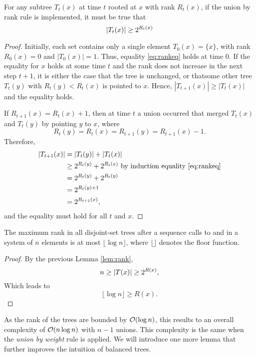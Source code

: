 \begin{lemma}\label{lem:rank}
  For any subtree $T_t(x)$ at time $t$ rooted at $x$ with rank $R_t(x)$, if the union by rank rule is implemented, it must be true that 
  \begin{equation}\label{eq:rankeq}
    \abs{T_t(x)} \geq 2^{R_t(x)}
  \end{equation}
\end{lemma}
\begin{proof}
  Initially, each set contains only a single element $T_0(x) = \{x\}$, with rank $R_0(x)=0$ and $|T_0(x)|=1$. Thus, equality \eqref{eq:rankeq} holds at time $0$. If the equality for $x$ holds at some time $t$ and the rank does not increase in the next step $t+1$, it is either the case that the tree is unchanged, or thatsome other tree $T_t(y)$ with $R_t(y)<R_t(x)$ is pointed to $x$. Hence, $|T_{t+1}(x)| \geq  |T_t(x)|$ and the equality holds. 
  
  If $R_{t+1}(x) = R_t(x) + 1$, then at time $t$ a union occurred that merged $T_t(x)$ and $T_t(y)$ by pointing $y$ to $x$, where
  \begin{equation*}
    R_t(y) = R_t(x) = R_{t+1}(y) = R_{t+1}(x) - 1.
  \end{equation*}
  Therefore,
  \begin{align*}
    \abs{T_{t+1}(x)} &= \abs{T_t(y)} + \abs{T_t(x)} \\
      &\geq 2^{R_t(y)} + 2^{R_t(x)} \text{ by induction equality \eqref{eq:rankeq}} \\
      &= 2^{R_t(y)} + 2^{R_t(y)} \\
      &= 2^{R_t(y)+1} \\
      &= 2^{R_{t+1}(x)},
  \end{align*}
  and the equality must hold for all $t$ and $x$. 
\end{proof}
\begin{lemma}\label{lem:maxrank}
    The maximum rank in all disjoint-set trees after a sequence calls to  and  in a system of $n$ elements is at most $\lfloor \log n \rfloor$, where $\lfloor \rfloor$ denotes the floor function. 
\end{lemma}
\begin{proof}
    By the previous Lemma \ref{lem:rank}, 
    \begin{equation*}
        n \geq \abs{T(x)} \geq 2^{R(x)}, 
    \end{equation*}
    Which leads to 
    \begin{equation*}
        \lfloor \log n \rfloor \geq R(x).
    \end{equation*}
\end{proof}
As the rank of the trees are bounded by $\mathcal{O}(\log n)$, this results to an overall complexity of $\mathcal{O}(n\log n)$ with $n-1$ unions. This complexity is the same when the \emph{union by weight} rule is applied. We will introduce one more lemma that further improves the intuition of balanced trees. 

